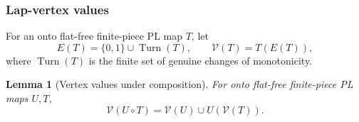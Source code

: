 \documentclass[11pt]{article}
\newtheorem{lemma}[theorem]{Lemma}
\theoremstyle{definition}
\theoremstyle{remark}
\begin{document}
\subsubsection{Lap-vertex values}

For an onto flat-free finite-piece PL map $T$, let
\[
 E(T)=\{0,1\}\cup\operatorname{Turn}(T),\qquad
 \mathcal V(T)=T(E(T)),
\]
where $\operatorname{Turn}(T)$ is the finite set of genuine changes of
monotonicity.

\begin{lemma}[Vertex values under composition]
\label{lem:vertex-composition}
For onto flat-free finite-piece PL maps $U,T$,
\begin{equation}\label{term:eq:vertex-composition}
 \mathcal V(U\circ T)=\mathcal V(U)\cup U(\mathcal V(T)).
\end{equation}
\end{lemma}
\end{document}
